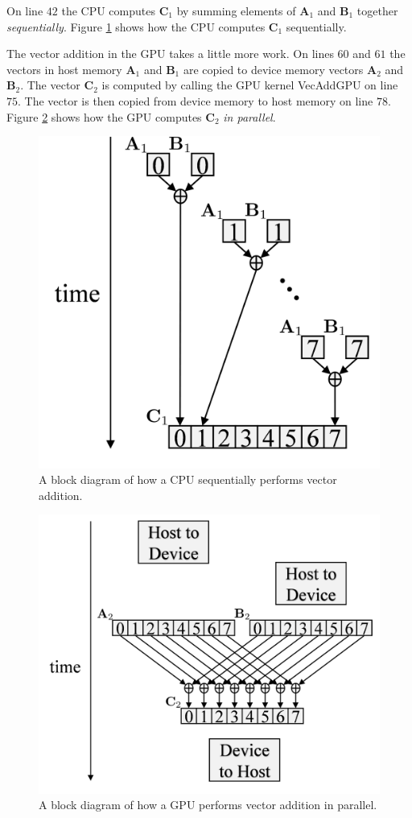 On line $42$ the CPU computes $\mathbf{C}_1$ by summing elements of $\mathbf{A}_1$ and $\mathbf{B}_1$ together \textit{sequentially}. Figure \ref{fig:CPUaddBlockDiagram} shows how the CPU computes $\mathbf{C}_1$  sequentially.

The vector addition in the GPU takes a little more work. 
On lines $60$ and $61$ the vectors in host memory $\mathbf{A}_1$ and $\mathbf{B}_1$ are copied to device memory vectors $\mathbf{A}_2$ and $\mathbf{B}_2$.
The vector $\mathbf{C}_2$ is computed by calling the GPU kernel VecAddGPU on line $75$.
The vector is then copied from device memory to host memory on line $78$.
Figure \ref{fig:GPUaddBlockDiagram} shows how the GPU computes $\mathbf{C}_2$ \textit{in parallel}.
\begin{figure}
	\centering\includegraphics[width=3.17in/100*55]{figures/gpu_intro/CPUaddBlockDiagram.pdf}
	\caption{A block diagram of how a CPU sequentially performs vector addition.}
	\label{fig:CPUaddBlockDiagram}
\end{figure}
\begin{figure}
	\centering\includegraphics[width=4.69in/100*55]{figures/gpu_intro/GPUaddBlockDiagram.pdf}
	\caption{A block diagram of how a GPU performs vector addition in parallel.}
	\label{fig:GPUaddBlockDiagram}
\end{figure}

